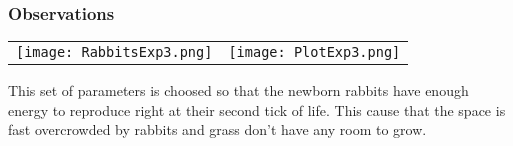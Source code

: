 \documentclass[11pt]{article}
\begin{document}
\subsubsection{Observations}
\begin{tabular}{|c c|}
\texttt{[image: RabbitsExp3.png]}&\texttt{[image: PlotExp3.png]}
\end{tabular}

This set of parameters is choosed so that the newborn rabbits have enough energy to reproduce right at their second tick of life. This cause that the space is fast overcrowded by rabbits and grass don't have any room to grow.
\end{document}
